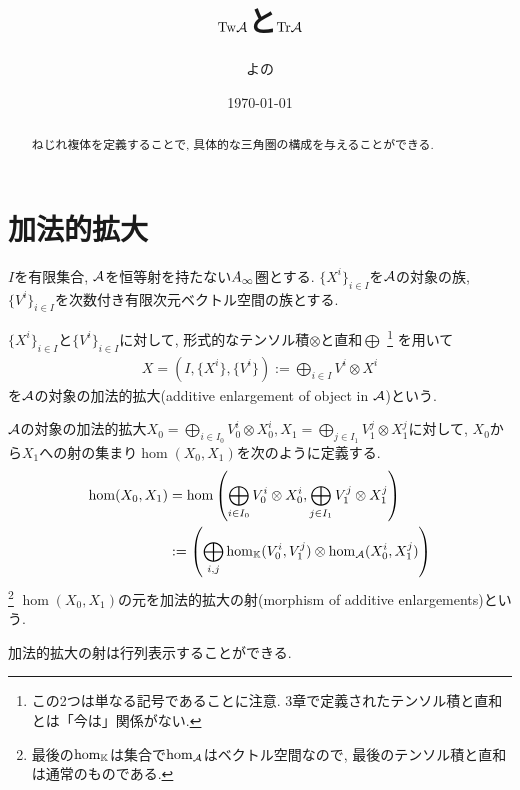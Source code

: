 \documentclass[uplatex, a4paper, 14Q, dvipdfmx]{jsarticle}
\title{\texorpdfstring{$\mathrm{Tw}\mathcal{A}$}{TwA}と\texorpdfstring{$\mathrm{Tr}{\mathcal{A}}$}{TrA}}
\author{よの}
\date{\today}
\begin{document}
\maketitle

\begin{abstract}
  ねじれ複体を定義することで, 具体的な三角圏の構成を与えることができる. 
\end{abstract}

\tableofcontents

\section{加法的拡大}

$I$を有限集合, $\A$を恒等射を持たない$A_{\infty}$圏とする.
$\{X^i\}_{i \in I}$を$\A$の対象の族, $\{V^i\}_{i \in I}$を次数付き有限次元ベクトル空間の族とする.

\begin{definition}[$\A$の対象の加法的拡大]
  $\{X^i\}_{i \in I}$と$\{V^i\}_{i \in I}$に対して, 形式的なテンソル積$\otimes$と直和$\bigoplus$
  \footnote{
    この2つは単なる記号であることに注意. 
    3章で定義されたテンソル積と直和とは「今は」関係がない.
  }
  を用いて
  \begin{align*}
    X = (I,\{X^i\},\{V^i\}) := \bigoplus_{i \in I} V^i \otimes X^i
  \end{align*}
  を$\A$の対象の加法的拡大(additive enlargement of object in $\A$)という. 
\end{definition}

\begin{definition}[加法的拡大の射]
  $\A$の対象の加法的拡大$X_0 = \bigoplus_{i \in I_0} V_0^i \otimes X_0^i, X_1 = \bigoplus_{j \in I_1} V_1^j \otimes X_1^j$に対して, $X_0$から$X_1$への射の集まり$\hom(X_0,X_1)$を次のように定義する. 
  \begin{align*}
    \hom (X_0,X_1) 
    &= \hom \qty(\bigoplus_{i \in I_0} V_0^i \otimes X_0^i, \bigoplus_{j \in I_1} V_1^j \otimes X_1^j) \\
    &:= \qty(\bigoplus_{i,j} \hom_{\mathbb{K}}(V_0^i,V_1^j) \otimes \hom_{\mathcal{A}}(X_0^i,X_1^j))
  \end{align*}
  \footnote{
    最後の$\hom_{\mathbb{K}}$は集合で$\hom_{\mathcal{A}}$はベクトル空間なので, 最後のテンソル積と直和は通常のものである. 
  }
  $\hom (X_0,X_1)$の元を加法的拡大の射(morphism of additive enlargements)という. 
\end{definition}

加法的拡大の射は行列表示することができる.
\end{document}
